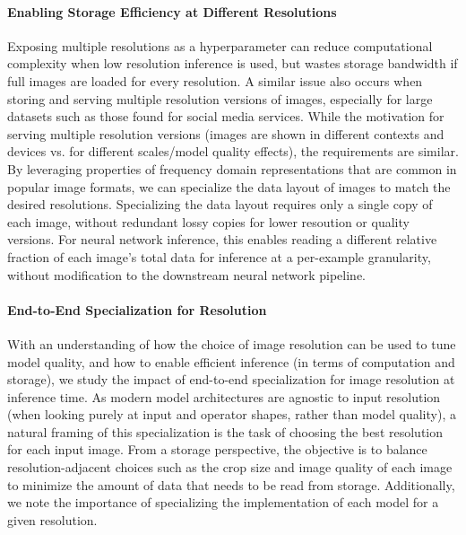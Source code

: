 \paragraph{Enabling Storage Efficiency at Different Resolutions}
Exposing multiple resolutions as a hyperparameter can reduce computational complexity when low resolution inference is used, but wastes storage bandwidth if full images are loaded for every resolution.
A similar issue also occurs when storing and serving multiple resolution versions of images, especially for large datasets such as those found for social media services.
While the motivation for serving multiple resolution versions (images are shown in different contexts and devices vs. for different scales/model quality effects), the requirements are similar.
By leveraging properties of frequency domain representations that are common in popular image formats, we can specialize the data layout of images to match the desired resolutions.
Specializing the data layout requires only a single copy of each image, without redundant lossy copies for lower resoution or quality versions.
For neural network inference, this enables reading a different relative fraction of each image's total data for inference at a per-example granularity, without modification to the downstream neural network pipeline.


\paragraph{End-to-End Specialization for Resolution}
With an understanding of how the choice of image resolution can be used to tune model quality, and how to enable efficient inference (in terms of computation and storage), we study the impact of end-to-end specialization for image resolution at inference time.
As modern model architectures are agnostic to input resolution (when looking purely at input and operator shapes, rather than model quality), a natural framing of this specialization is the task of choosing the best resolution for each input image.
From a storage perspective, the objective is to balance resolution-adjacent choices such as the crop size and image quality of each image to minimize the amount of data that needs to be read from storage.
Additionally, we note the importance of specializing the implementation of each model for a given resolution.

